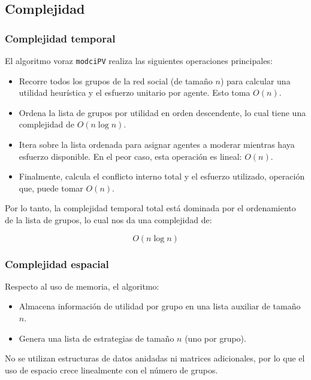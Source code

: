 \documentclass[11pt,letter]{article}
\begin{document}
    \subsection{Complejidad}

    \subsubsection{Complejidad temporal}

    El algoritmo voraz \texttt{modciPV} realiza las siguientes operaciones principales:

    \begin{itemize}
        \item Recorre todos los grupos de la red social (de tamaño $n$) para calcular una utilidad heurística y el esfuerzo unitario por agente. Esto toma ${O}(n)$.
        \item Ordena la lista de grupos por utilidad en orden descendente, lo cual tiene una complejidad de ${O}(n \log n)$.
        \item Itera sobre la lista ordenada para asignar agentes a moderar mientras haya esfuerzo disponible. En el peor caso, esta operación es lineal: ${O}(n)$.
        \item Finalmente, calcula el conflicto interno total y el esfuerzo utilizado, operación que, puede tomar ${O}(n)$.
    \end{itemize}

    Por lo tanto, la complejidad temporal total está dominada por el ordenamiento de la lista de grupos, lo cual nos da una complejidad de:

    \[
            {O}(n \log n)
    \]

    \subsubsection{Complejidad espacial}

    Respecto al uso de memoria, el algoritmo:

    \begin{itemize}
        \item Almacena información de utilidad por grupo en una lista auxiliar de tamaño $n$.
        \item Genera una lista de estrategias de tamaño $n$ (uno por grupo).
    \end{itemize}

    No se utilizan estructuras de datos anidadas ni matrices adicionales, por lo que el uso de espacio crece linealmente con el número de grupos.
\end{document}
